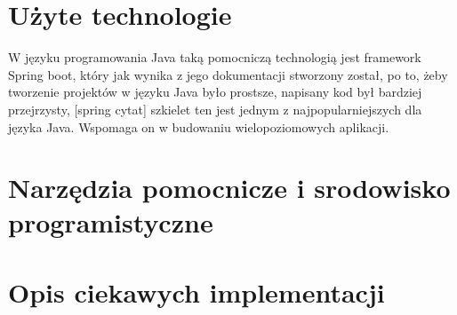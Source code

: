 \section{Użyte technologie}
W języku programowania Java taką pomocniczą technologią jest framework Spring boot, który  jak wynika z jego dokumentacji stworzony został, po to, żeby tworzenie projektów w języku Java było prostsze, napisany kod był bardziej przejrzysty, [spring cytat]  szkielet ten jest jednym z najpopularniejszych dla języka Java. Wspomaga on w budowaniu wielopoziomowych aplikacji. 
\section{Narzędzia pomocnicze i srodowisko programistyczne }
\section{Opis ciekawych implementacji}
